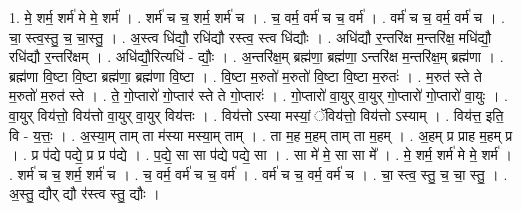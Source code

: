 \documentclass[17pt]{extarticle}
\begin{document}
1. मे॒ शर्म॒ शर्म॑ मे मे॒ शर्म॑ । . शर्म॑ च च॒ शर्म॒ शर्म॑ च । . च॒ वर्म॒ वर्म॑ च च॒ वर्म॑ । . वर्म॑ च च॒ वर्म॒ वर्म॑ च । . चा॒ स्त्व॒स्तु॒ च॒ चा॒स्तु॒ । . अ॒स्त्व धि॑द्यौ॒ रधि॑द्यौ रस्त्व॒ स्त्व धि॑द्यौः । . अधि॑द्यौ र॒न्तरि॑क्ष म॒न्तरि॑क्ष॒ मधि॑द्यौ॒ रधि॑द्यौ र॒न्तरि॑क्षम् । . अधि॑द्यौ॒रित्यधि॑ - द्यौः॒ । . अ॒न्तरि॑क्ष॒म् ब्रह्म॑णा॒ ब्रह्म॑णा॒ ऽन्तरि॑क्ष म॒न्तरि॑क्ष॒म् ब्रह्म॑णा । . ब्रह्म॑णा वि॒ष्टा वि॒ष्टा ब्रह्म॑णा॒ ब्रह्म॑णा वि॒ष्टा । . वि॒ष्टा म॒रुतो॑ म॒रुतो॑ वि॒ष्टा वि॒ष्टा म॒रुतः॑ । . म॒रुत॑ स्ते ते म॒रुतो॑ म॒रुत॑ स्ते । . ते॒ गो॒प्तारो॑ गो॒प्तार॑ स्ते ते गो॒प्तारः॑ । . गो॒प्तारो॑ वा॒युर् वा॒युर् गो॒प्तारो॑ गो॒प्तारो॑ वा॒युः । . वा॒युर् विय॑त्तो॒ विय॑त्तो वा॒युर् वा॒युर् विय॑त्तः । . विय॑त्तो ऽस्या मस्यां॒ ॅविय॑त्तो॒ विय॑त्तो ऽस्याम् । . विय॑त्त॒ इति॒ वि - य॒त्तः॒ । . अ॒स्या॒म् ताम् ता म॑स्या मस्या॒म् ताम् । . ता म॒ह म॒हम् ताम् ता म॒हम् । . अ॒हम् प्र प्राह म॒हम् प्र । . प्र प॑द्ये पद्ये॒ प्र प्र प॑द्ये । . प॒द्ये॒ सा सा प॑द्ये पद्ये॒ सा । . सा मे॑ मे॒ सा सा मे᳚ । . मे॒ शर्म॒ शर्म॑ मे मे॒ शर्म॑ । . शर्म॑ च च॒ शर्म॒ शर्म॑ च । . च॒ वर्म॒ वर्म॑ च च॒ वर्म॑ । . वर्म॑ च च॒ वर्म॒ वर्म॑ च । . चा॒ स्त्व॒ स्तु॒ च॒ चा॒ स्तु॒ । . अ॒स्तु॒ द्यौर् द्यौ र॑स्त्व स्तु॒ द्यौः । \newline
\end{document}
